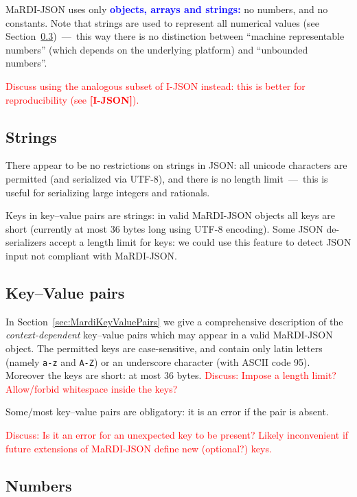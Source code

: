 \documentclass{article}
\newcommand{\MaRDIJSON}{MaRDI-JSON}
\def\red#1{\textcolor{red}{#1}}
\def\blue#1{\textcolor{blue}{#1}}
\begin{document}
{\MaRDIJSON} uses only \blue{\textbf{objects, arrays and strings:}} no
numbers, and no constants.  Note that strings are used to represent
all numerical values (see Section~\ref{sec:numbers})~---~this way
there is no distinction between ``machine representable numbers''
(which depends on the underlying platform) and ``unbounded numbers''.

\red{Discuss using the analogous subset of I-JSON instead: this is
  better for reproducibility (see \textbf{[I-JSON]}).}


\subsection{Strings}

There appear to be no restrictions on strings in JSON: all unicode
characters are permitted (and serialized via UTF-8), and there is no
length limit~---~this is useful for serializing large integers and
rationals.

Keys in key--value pairs are strings: in valid {\MaRDIJSON} objects
all keys are short (currently at most 36 bytes long using UTF-8 encoding).
Some JSON de-serializers accept a length limit for keys: we could use
this feature to detect JSON input not compliant with {\MaRDIJSON}.


\subsection{Key--Value pairs}

In Section~\ref{sec:MardiKeyValuePairs} we give a comprehensive
description of the \textit{context-dependent} key--value pairs which
may appear in a valid {\MaRDIJSON} object.  The permitted keys are
case-sensitive, and contain only latin letters (namely \texttt{a-z}
and \texttt{A-Z}) or an underscore character (with ASCII code 95).
Moreover the keys are short: at most 36 bytes.  \red{Discuss: Impose a length limit?  Allow/forbid whitespace inside the keys?}

Some/most key--value pairs are obligatory: it is an error if the pair is absent.

\red{Discuss: Is it an error for an unexpected key to be present?  Likely inconvenient if future extensions of {\MaRDIJSON} define new (optional?) keys.}



\subsection{Numbers}
\label{sec:numbers}
\end{document}
